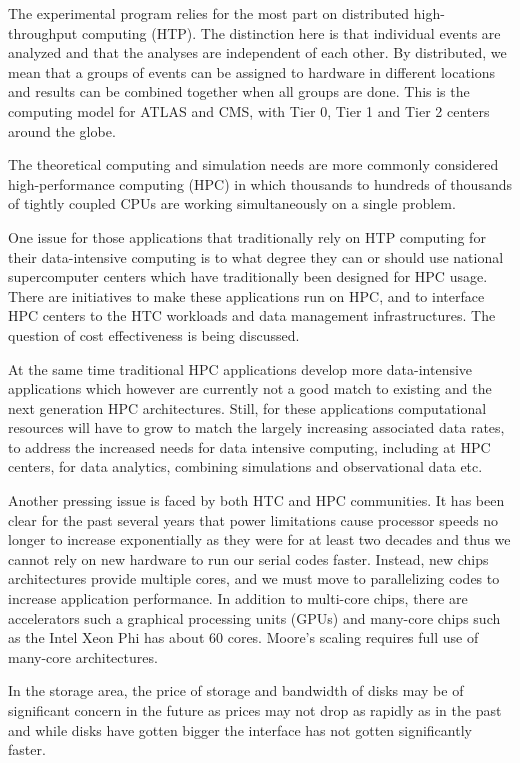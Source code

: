 The experimental program relies for the most part on distributed high-throughput computing (HTP).  The distinction here is that individual events are analyzed and that the analyses are independent of each other.  By distributed, we mean that a groups of events can be assigned to hardware in different locations and results can be combined together when all groups are done.  This is the computing model for ATLAS and CMS, with Tier 0, Tier 1 and Tier 2 centers around the globe.

The theoretical computing and simulation needs are more commonly considered high-performance computing (HPC) in which thousands to hundreds of thousands of tightly coupled CPUs are working simultaneously on a single problem.

One issue for those applications that traditionally rely on HTP computing for their data-intensive computing is to what degree they can or should use national supercomputer centers which have traditionally been designed for HPC usage. There are initiatives to make these applications run on HPC, and to interface HPC centers to the HTC workloads and data management infrastructures. The question of cost effectiveness is being discussed.  

At the same time traditional HPC applications develop more data-intensive applications which however are currently not a good match to existing and the next generation HPC architectures. Still, for these applications computational resources will have to grow to match the largely increasing associated data rates, to address the increased needs for data intensive computing, including at HPC centers, for data analytics, combining simulations and observational data etc. 

Another pressing issue is faced by both HTC and HPC communities. It has been clear for the past several years that power limitations cause processor speeds no longer to increase exponentially as they were for at least two decades and thus we cannot rely on new hardware to run our serial codes faster. Instead, new chips architectures provide multiple cores, and we must move to parallelizing codes to increase application performance. In addition to multi-core chips, there are accelerators such a graphical processing units (GPUs) and many-core chips such as the Intel Xeon Phi has about 60 cores. Moore’s scaling requires full use of many-core architectures. 

In the storage area, the price of storage and bandwidth of disks may be of significant concern in the future as prices may not drop as rapidly as in the past and while disks have gotten bigger the interface has not gotten significantly faster.

